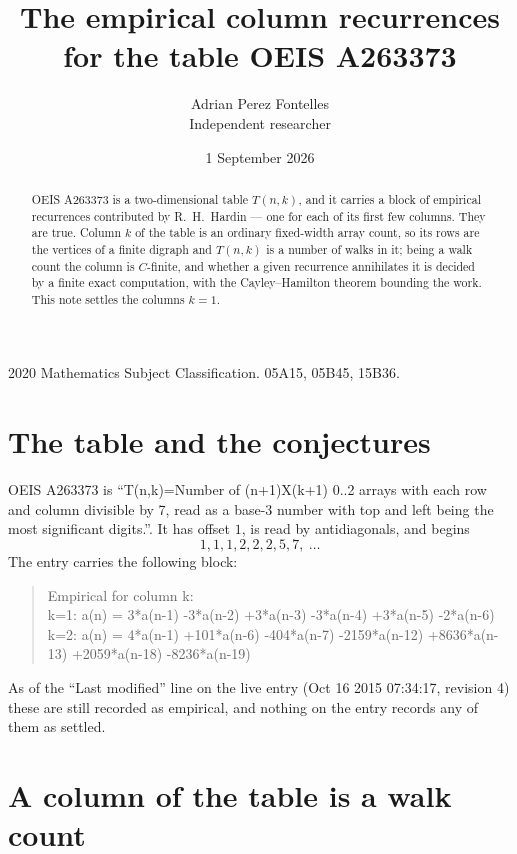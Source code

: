 \documentclass[11pt,a4paper]{article}
\title{The empirical column recurrences for the table OEIS A263373}
\author{Adrian Perez Fontelles\\ \small Independent researcher}
\date{1 September 2026}
\theoremstyle{plain}
\theoremstyle{definition}
\begin{document}
\maketitle

\begin{abstract}
OEIS A263373 is a two-dimensional table $T(n,k)$, and it carries a block of empirical
recurrences contributed by R.~H.~Hardin --- one for each of its first few columns. They are
true. Column $k$ of the table is an ordinary fixed-width array count, so its rows are the
vertices of a finite digraph and $T(n,k)$ is a number of walks in it; being a walk count the
column is $C$-finite, and whether a given recurrence annihilates it is decided by a finite
exact computation, with the Cayley--Hamilton theorem bounding the work. This note settles the columns $k=1$.
\end{abstract}

\noindent\small 2020 Mathematics Subject Classification. 05A15, 05B45, 15B36.\normalsize

\section{The table and the conjectures}

OEIS A263373 is ``T(n,k)=Number of (n+1)X(k+1) 0..2 arrays with each row and column divisible by 7, read as a base-3 number with top and left being the most significant digits.''. It has offset $1$, is
read by antidiagonals, and begins
\[
1, 1, 1, 2, 2, 2, 5, 7,\ \dots
\]
The entry carries the following block:
\begin{quote}\small
Empirical for column k:\\
k=1: a(n) = 3*a(n-1) -3*a(n-2) +3*a(n-3) -3*a(n-4) +3*a(n-5) -2*a(n-6)\\
k=2: a(n) = 4*a(n-1) +101*a(n-6) -404*a(n-7) -2159*a(n-12) +8636*a(n-13) +2059*a(n-18) -8236*a(n-19)\\
\end{quote}
As of the ``Last modified'' line on the live entry (Oct 16 2015 07:34:17, revision 4) these are still
recorded as empirical, and nothing on the entry records any of them as settled.

\section{A column of the table is a walk count}
\end{document}

